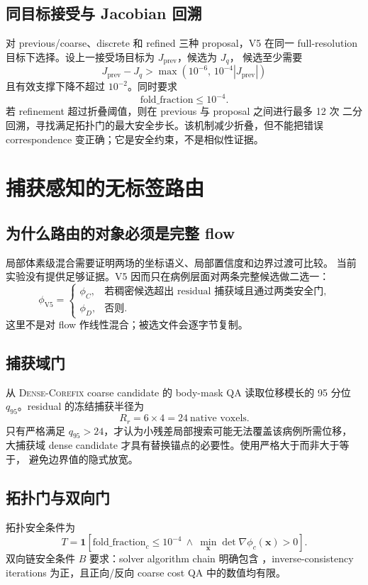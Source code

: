 \documentclass[11pt,a4paper]{ctexart}
\newcommand{\Core}{\textsc{Dense-Corefix}}
\begin{document}
\subsection{同目标接受与 Jacobian 回溯}
对 previous/coarse、discrete 和 refined 三种 proposal，V5 在同一 full-resolution
目标下选择。设上一接受场目标为 $J_{\mathrm{prev}}$，候选为 $J_q$，
候选至少需要
\[
J_{\mathrm{prev}}-J_q
>
\max\left(10^{-6},\,10^{-4}|J_{\mathrm{prev}}|\right)
\]
且有效支撑下降不超过 $10^{-2}$。同时要求
\[
\mathrm{fold\_fraction}\le10^{-4}.
\]
若 refinement 超过折叠阈值，则在 previous 与 proposal 之间进行最多 12 次
二分回溯，寻找满足拓扑门的最大安全步长。该机制减少折叠，但不能把错误
correspondence 变正确；它是安全约束，不是相似性证据。

\section{捕获感知的无标签路由}
\label{sec:router}

\subsection{为什么路由的对象必须是完整 flow}
局部体素级混合需要证明两场的坐标语义、局部置信度和边界过渡可比较。
当前实验没有提供足够证据。V5 因而只在病例层面对两条完整候选做二选一：
\[
\phi_{\mathrm{V5}}=
\begin{cases}
\phi_C,& \text{若稠密候选超出 residual 捕获域且通过两类安全门},\\
\phi_D,& \text{否则}.
\end{cases}
\]
这里不是对 flow 作线性混合；被选文件会逐字节复制。

\subsection{捕获域门}
从 \Core{} coarse candidate 的 body-mask QA 读取位移模长的 95 分位
$q_{95}$。residual 的冻结捕获半径为
\[
R_r=6\times4=24\ \text{native voxels}.
\]
只有严格满足 $q_{95}>24$，才认为小残差局部搜索可能无法覆盖该病例所需位移，
大捕获域 dense candidate 才具有替换锚点的必要性。使用严格大于而非大于等于，
避免边界值的隐式放宽。

\subsection{拓扑门与双向门}
拓扑安全条件为
\[
T=
\mathbf{1}\!\left[
\mathrm{fold\_fraction}_{c}\le10^{-4}
\ \land\
\min_{\mathbf{x}}\det\nabla\phi_c(\mathbf{x})>0
\right].
\]
双向链安全条件 $B$ 要求：solver algorithm chain 明确包含
，inverse-consistency iterations
为正，且正向/反向 coarse cost QA 中的数值均有限。
\end{document}

